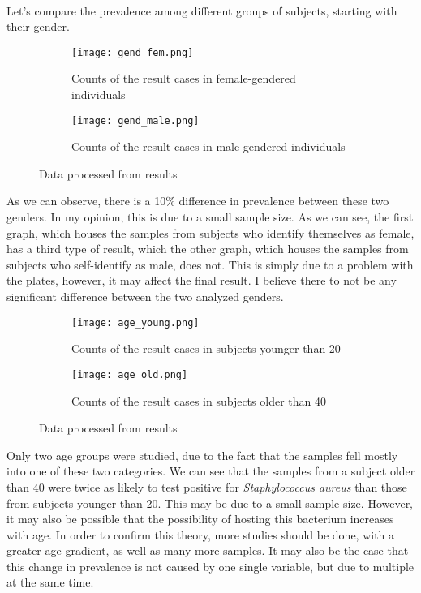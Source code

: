 \paragraph{}Let's compare the prevalence among different groups of subjects, starting with their gender.
\begin{center}\begin{figure}[H]\centering\begin{subfigure}[b]{0.4\linewidth}\texttt{[image: gend\_fem.png]}\caption{Counts of the result cases in female-gendered individuals}\end{subfigure}\begin{subfigure}[b]{0.38\linewidth}\texttt{[image: gend\_male.png]}\caption{Counts of the result cases in male-gendered individuals}\end{subfigure}\caption{Data processed from results}\end{figure}\end{center}\vspace{-1.5em}
As we can observe, there is a 10\% difference in prevalence between these two genders. In my opinion, this is due to a small sample size. As we can see, the first graph, which houses the samples from subjects who identify themselves as female, has a third type of result, which the other graph, which houses the samples from subjects who self-identify as male, does not. This is simply due to a problem with the plates, however, it may affect the final result. I believe there to not be any significant difference between the two analyzed genders.
\begin{center}\begin{figure}[H]\centering\begin{subfigure}[b]{0.4\linewidth}\texttt{[image: age\_young.png]}\caption{Counts of the result cases in subjects younger than 20}\end{subfigure}\begin{subfigure}[b]{0.38\linewidth}\texttt{[image: age\_old.png]}\caption{Counts of the result cases in subjects older than 40}\end{subfigure}\caption{Data processed from results}\end{figure}\end{center}\vspace{-1.5em}
Only two age groups were studied, due to the fact that the samples fell mostly into one of these two categories. We can see that the samples from a subject older than 40 were twice as likely to test positive for \emph{Staphylococcus aureus} than those from subjects younger than 20. This may be due to a small sample size. However, it may also be possible that the possibility of hosting this bacterium increases with age. In order to confirm this theory, more studies should be done, with a greater age gradient, as well as many more samples. It may also be the case that this change in prevalence is not caused by one single variable, but due to multiple at the same time.
